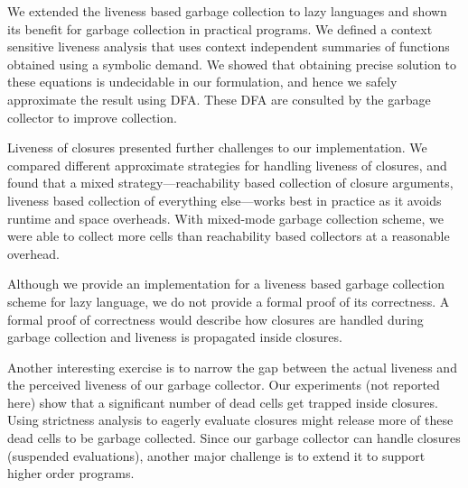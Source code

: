 \documentclass[9pt]{sigplanconf}
\begin{document}

We extended the liveness based garbage collection to lazy
  languages and shown its benefit  for garbage collection in practical
  programs. We  defined a context  sensitive liveness analysis  that uses
  context independent summaries of functions obtained using a symbolic
  demand. We showed  that obtaining precise solution  to these equations
  is undecidable in  our formulation, and hence  we safely approximate
  the result using DFA. These DFA are consulted by the garbage collector
  to improve  collection.

  Liveness   of   closures   presented  further   challenges   to   our
  implementation.   We compared  different approximate  strategies for
  handling   liveness   of   closures,   and  found   that   a   mixed
  strategy---reachability  based  collection   of  closure  arguments,
  liveness  based  collection  of   everything  else---works  best  in
  practice as it  avoids runtime and space  overheads.  With mixed-mode
  garbage collection scheme,  we were able to collect  more cells than
  reachability based collectors at a reasonable overhead.

  Although we  provide an  implementation for  a liveness  based garbage
  collection scheme for lazy language, we  do not provide a formal proof
  of its correctness.  A formal  proof of correctness would describe how
  closures  are  handled  during  garbage  collection  and  liveness  is
  propagated inside closures. 

  Another interesting exercise is to narrow the gap between the actual
  liveness and  the perceived liveness  of our garbage  collector. Our
  experiments (not  reported here) show  that a significant  number of
  dead cells  get trapped inside closures.   Using strictness analysis
  to eagerly evaluate closures might  release more of these dead cells
  to be  garbage collected.   Since our  garbage collector  can handle
  closures  (suspended evaluations),  another  major  challenge is  to
  extend it to support higher order programs.
\end{document}
